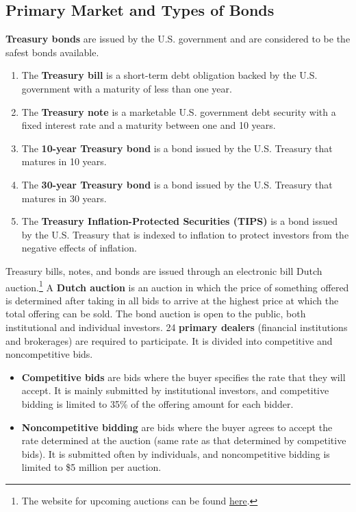 \documentclass{article}
\begin{document}
  \subsection{Primary Market and Types of Bonds} 

    \begin{definition}
      \textbf{Treasury bonds} are issued by the U.S. government and are considered to be the safest bonds available. 
      \begin{enumerate}
        \item The \textbf{Treasury bill} is a short-term debt obligation backed by the U.S. government with a maturity of less than one year. 
        \item The \textbf{Treasury note} is a marketable U.S. government debt security with a fixed interest rate and a maturity between one and 10 years.
        \item The \textbf{10-year Treasury bond} is a bond issued by the U.S. Treasury that matures in 10 years. 
        \item The \textbf{30-year Treasury bond} is a bond issued by the U.S. Treasury that matures in 30 years. 
        \item The \textbf{Treasury Inflation-Protected Securities (TIPS)} is a bond issued by the U.S. Treasury that is indexed to inflation to protect investors from the negative effects of inflation. 
      \end{enumerate}
    \end{definition}

    Treasury bills, notes, and bonds are issued through an electronic bill Dutch auction.\footnote{The website for upcoming auctions can be found \href{https://www.treasurydirect.gov/auctions/upcoming/}{here}.} A \textbf{Dutch auction} is an auction in which the price of something offered is determined after taking in all bids to arrive at the highest price at which the total offering can be sold. The bond auction is open to the public, both institutional and individual investors. 24 \textbf{primary dealers} (financial institutions and brokerages) are required to participate. It is divided into competitive and noncompetitive bids.
    \begin{itemize}
        \item \textbf{Competitive bids} are bids where the buyer specifies the rate that they will accept. It is mainly submitted by institutional investors, and competitive bidding is limited to 35\% of the offering amount for each bidder.
        \item \textbf{Noncompetitive bidding} are bids where the buyer agrees to accept the rate determined at the auction (same rate as that determined by competitive bids). It is submitted often by individuals, and noncompetitive bidding is limited to \$5 million per auction.
    \end{itemize}
\end{document}
